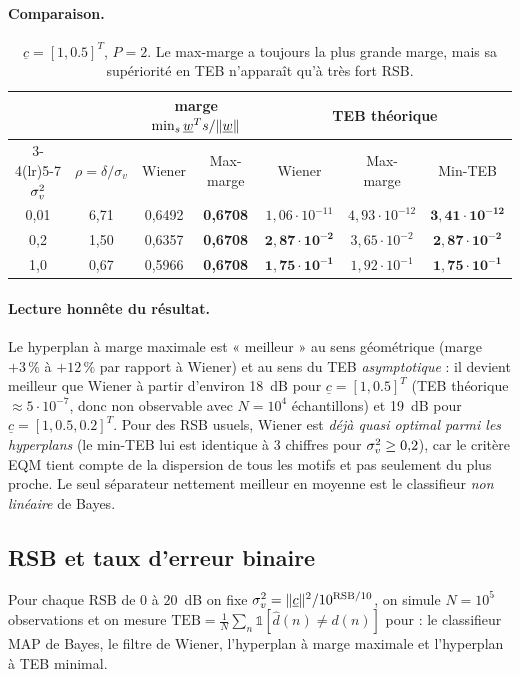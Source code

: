 \paragraph{Comparaison.}
\begin{table}[H]\centering\small
\begin{tabular}{ccccccc}\toprule
 & & \multicolumn{2}{c}{marge $\min_s\underline{w}^T s/\|\underline{w}\|$} & \multicolumn{3}{c}{TEB théorique}\\\cmidrule(lr){3-4}\cmidrule(lr){5-7}
$\sigma_v^2$ & $\rho=\delta/\sigma_v$ & Wiener & Max-marge & Wiener & Max-marge & Min-TEB\\\midrule
0,01 & 6,71 & 0,6492 & \textbf{0,6708} & $1{,}06\!\cdot\!10^{-11}$ & $4{,}93\!\cdot\!10^{-12}$ & $\mathbf{3{,}41\!\cdot\!10^{-12}}$\\
0,2  & 1,50 & 0,6357 & \textbf{0,6708} & $\mathbf{2{,}87\!\cdot\!10^{-2}}$ & $3{,}65\!\cdot\!10^{-2}$ & $\mathbf{2{,}87\!\cdot\!10^{-2}}$\\
1,0  & 0,67 & 0,5966 & \textbf{0,6708} & $\mathbf{1{,}75\!\cdot\!10^{-1}}$ & $1{,}92\!\cdot\!10^{-1}$ & $\mathbf{1{,}75\!\cdot\!10^{-1}}$\\\bottomrule
\end{tabular}
\caption{$\underline c=[1,0.5]^T$, $P=2$. Le max-marge a toujours la plus grande marge, mais sa supériorité en TEB n'apparaît qu'à très fort RSB.}\label{tab:cmp}
\end{table}

\paragraph{Lecture honnête du résultat.} Le hyperplan à marge maximale est « meilleur » au sens géométrique (marge $+3\,\%$ à $+12\,\%$ par rapport à Wiener) et au sens du TEB \emph{asymptotique} : il devient meilleur que Wiener à partir d'environ 18~dB pour $\underline c=[1,0.5]^T$ (TEB théorique $\approx5\cdot10^{-7}$, donc non observable avec $N=10^4$ échantillons) et 19~dB pour $\underline c=[1,0.5,0.2]^T$. Pour des RSB usuels, Wiener est \emph{déjà quasi optimal parmi les hyperplans} (le min-TEB lui est identique à 3 chiffres pour $\sigma_v^2\ge0{,}2$), car le critère EQM tient compte de la dispersion de tous les motifs et pas seulement du plus proche. Le seul séparateur nettement meilleur en moyenne est le classifieur \emph{non linéaire} de Bayes.

\subsection{RSB et taux d'erreur binaire}
Pour chaque RSB de $0$ à $20$~dB on fixe $\sigma_v^2=\|\underline c\|^2/10^{\mathrm{RSB}/10}$, on simule $N=10^5$ observations et on mesure $\mathrm{TEB}=\frac1N\sum_n\mathbb 1[\hat d(n)\neq d(n)]$ pour : le classifieur MAP de Bayes, le filtre de Wiener, l'hyperplan à marge maximale et l'hyperplan à TEB minimal.

